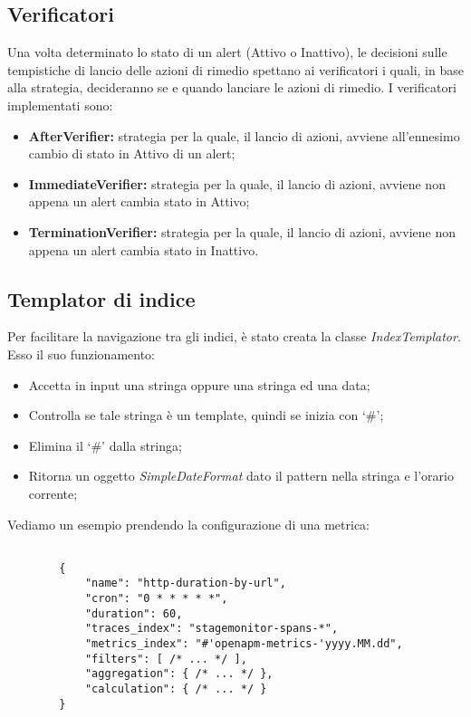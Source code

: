     \subsection{Verificatori}

	Una volta determinato lo stato di un alert (Attivo o Inattivo), le decisioni sulle tempistiche di lancio delle azioni di rimedio spettano ai verificatori i quali, in base alla strategia, decideranno se e quando lanciare le azioni di rimedio. I verificatori implementati sono:
	\begin{itemize}
                \item \textbf{AfterVerifier:} strategia per la quale, il lancio di azioni, avviene all'ennesimo cambio di stato in Attivo di un alert;
		\item \textbf{ImmediateVerifier:} strategia per la quale, il lancio di azioni, avviene non appena un alert cambia stato in Attivo;
		\item \textbf{TerminationVerifier:} strategia per la quale, il lancio di azioni, avviene non appena un alert cambia stato in Inattivo.
	\end{itemize}

    \subsection{Templator di indice}

		Per facilitare la navigazione tra gli indici, è stato creata la classe \textit{IndexTemplator}. Esso il suo funzionamento:
		\begin{itemize}
		        \item Accetta in input una stringa oppure una stringa ed una data;
			\item Controlla se tale stringa è un template, quindi se inizia con `\#';
			\item Elimina il `\#' dalla stringa;
			\item Ritorna un oggetto \textit{SimpleDateFormat} dato il pattern nella stringa e l'orario corrente;
		\end{itemize}

		Vediamo un esempio prendendo la configurazione di una metrica:
		\begin{lstlisting}[style=json]

		{
			"name": "http-duration-by-url",
			"cron": "0 * * * * *",
			"duration": 60,
			"traces_index": "stagemonitor-spans-*",
			"metrics_index": "#'openapm-metrics-'yyyy.MM.dd",
			"filters": [ /* ... */ ],
			"aggregation": { /* ... */ },
			"calculation": { /* ... */ }
		}
		\end{lstlisting}

